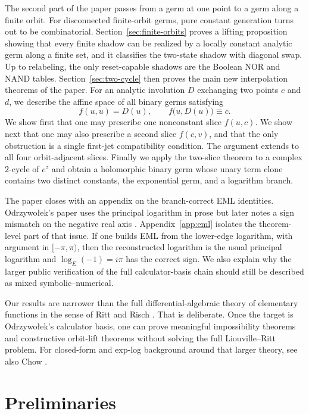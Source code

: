\documentclass[11pt]{amsart}
\numberwithin{equation}{section}
\theoremstyle{remark}
\theoremstyle{definition}
\begin{document}
The second part of the paper passes from a germ at one point to a germ along a finite orbit. For disconnected finite-orbit germs, pure constant generation turns out to be combinatorial. Section~\ref{sec:finite-orbits} proves a lifting proposition showing that every finite shadow can be realized by a locally constant analytic germ along a finite set, and it classifies the two-state shadow with diagonal swap. Up to relabeling, the only reset-capable shadows are the Boolean NOR and NAND tables. Section~\ref{sec:two-cycle} then proves the main new interpolation theorems of the paper. For an analytic involution $D$ exchanging two points $c$ and $d$, we describe the affine space of all binary germs satisfying
\[
f(u,u)=D(u),\qquad f\bigl(u,D(u)\bigr)\equiv c.
\]
We show first that one may prescribe one nonconstant slice $f(u,c)$. We show next that one may also prescribe a second slice $f(c,v)$, and that the only obstruction is a single first-jet compatibility condition. The argument extends to all four orbit-adjacent slices. Finally we apply the two-slice theorem to a complex $2$-cycle of $e^z$ and obtain a holomorphic binary germ whose unary term clone contains two distinct constants, the exponential germ, and a logarithm branch.

The paper closes with an appendix on the branch-correct EML identities. Odrzywo{\l}ek's paper uses the principal logarithm in prose but later notes a sign mismatch on the negative real axis \cite{Odrzywolek2026}. Appendix~\ref{app:eml} isolates the theorem-level part of that issue. If one builds EML from the lower-edge logarithm, with argument in $[-\pi,\pi)$, then the reconstructed logarithm is the usual principal logarithm and $\log_E(-1)=i\pi$ has the correct sign. We also explain why the larger public verification of the full calculator-basis chain should still be described as mixed symbolic--numerical.

Our results are narrower than the full differential-algebraic theory of elementary functions in the sense of Ritt and Risch \cite{Ritt1948,Risch1969}. That is deliberate. Once the target is Odrzywo{\l}ek's calculator basis, one can prove meaningful impossibility theorems and constructive orbit-lift theorems without solving the full Liouville--Ritt problem. For closed-form and exp-log background around that larger theory, see also Chow \cite{Chow1999}.

\section{Preliminaries}\label{sec:preliminaries}
\end{document}

